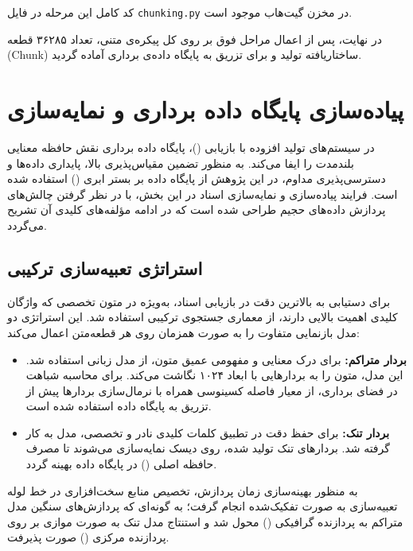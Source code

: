 کد کامل این مرحله در فایل \texttt{chunking.py} در مخزن گیت‌هاب موجود است.

در نهایت، پس از اعمال مراحل فوق بر روی کل پیکره‌ی متنی، تعداد ۳۶۲۸۵ قطعه (Chunk) ساختاریافته تولید و برای تزریق به پایگاه داده‌ی برداری آماده گردید.

\section{پیاده‌سازی پایگاه داده برداری و نمایه‌سازی}

در سیستم‌های تولید افزوده با بازیابی ()، پایگاه داده برداری نقش حافظه معنایی بلندمدت را ایفا می‌کند. به منظور تضمین مقیاس‌پذیری بالا، پایداری داده‌ها و دسترسی‌پذیری مداوم، در این پژوهش از پایگاه داده  بر بستر ابری () استفاده شده است. فرایند پیاده‌سازی و نمایه‌سازی اسناد در این بخش، با در نظر گرفتن چالش‌های پردازش داده‌های حجیم طراحی شده است که در ادامه مؤلفه‌های کلیدی آن تشریح می‌گردد.

\subsection{استراتژی تعبیه‌سازی ترکیبی}

برای دستیابی به بالاترین دقت در بازیابی اسناد، به‌ویژه در متون تخصصی که واژگان کلیدی اهمیت بالایی دارند، از معماری جستجوی ترکیبی استفاده شد. این استراتژی دو مدل بازنمایی متفاوت را به صورت همزمان روی هر قطعه‌متن اعمال می‌کند:

\begin{itemize}
	\item \textbf{بردار متراکم:} برای درک معنایی و مفهومی عمیق متون، از مدل زبانی  استفاده شد. این مدل، متون را به بردارهایی با ابعاد ۱۰۲۴ نگاشت می‌کند. برای محاسبه شباهت در فضای برداری، از معیار فاصله کسینوسی همراه با نرمال‌سازی بردارها پیش از تزریق به پایگاه داده استفاده شده است.
	\item \textbf{بردار تنک:} برای حفظ دقت در تطبیق کلمات کلیدی نادر و تخصصی، مدل  به کار گرفته شد. بردارهای تنک تولید شده، روی دیسک نمایه‌سازی می‌شوند تا مصرف حافظه اصلی () در پایگاه داده بهینه گردد.
\end{itemize}

به منظور بهینه‌سازی زمان پردازش، تخصیص منابع سخت‌افزاری در خط لوله تعبیه‌سازی به صورت تفکیک‌شده انجام گرفت؛ به گونه‌ای که پردازش‌های سنگین مدل متراکم به پردازنده گرافیکی () محول شد و استنتاج مدل تنک به صورت موازی بر روی پردازنده مرکزی () صورت پذیرفت.

